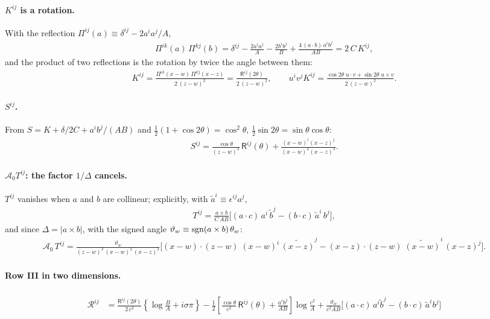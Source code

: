 \documentclass[10pt]{article}
\numberwithin{equation}{section}
\begin{document}
\paragraph{$K^{ij}$ is a rotation.} With the reflection $\Pi^{ij}(a)\equiv\delta^{ij}-2a^{i}a^{j}/A$,
\begin{align}
\Pi^{ik}(a)\,\Pi^{kj}(b)=\delta^{ij}-\frac{2a^{i}a^{j}}{A}-\frac{2b^{i}b^{j}}{B}+\frac{4\,(a\cdot b)\,a^{i}b^{j}}{AB}=2\,C\,K^{ij},
\end{align}
and the product of two reflections is the rotation by twice the angle between them:
\begin{align}
K^{ij}=\frac{\Pi^{ik}(x-w)\,\Pi^{kj}(x-z)}{2\,(z-w)^{2}}=\frac{\mathsf{R}^{ij}(2\theta)}{2\,(z-w)^{2}},\qquad
u^{i}v^{j}K^{ij}=\frac{\cos2\theta\;u\cdot v+\sin2\theta\;u\times v}{2\,(z-w)^{2}} .
\end{align}

\paragraph{$S^{ij}$.} From $S=K+\delta/2C+a^{i}b^{j}/(AB)$ and $\tfrac12(1+\cos2\theta)=\cos^{2}\theta$, $\tfrac12\sin2\theta=\sin\theta\cos\theta$:
\begin{align}
S^{ij}=\frac{\cos\theta}{(z-w)^{2}}\,\mathsf{R}^{ij}(\theta)+\frac{(x-w)^{i}(x-z)^{j}}{(x-w)^{2}(x-z)^{2}} .
\end{align}

\paragraph{$\mathcal{A}_{0}T^{ij}$: the factor $1/\Delta$ cancels.} $T^{ij}$ vanishes when $a$ and $b$ are collinear; explicitly, with $\tilde a^{i}\equiv\epsilon^{ij}a^{j}$,
\begin{align}
T^{ij}=\frac{a\times b}{C\,AB}\Big[(a\cdot c)\,a^{i}\,\tilde b^{j}-(b\cdot c)\,\tilde a^{i}\,b^{j}\Big],
\end{align}
and since $\Delta=|a\times b|$, with the signed angle $\vartheta_{w}\equiv{\rm sgn}(a\times b)\,\theta_{w}$:
\begin{align}
\mathcal{A}_{0}\,T^{ij}=\frac{\vartheta_{w}}{(z-w)^{2}\,(x-w)^{2}\,(x-z)^{2}}\Big[(x-w)\!\cdot\!(z-w)\;(x-w)^{i}\,\widetilde{(x-z)}^{j}-(x-z)\!\cdot\!(z-w)\;\widetilde{(x-w)}^{i}\,(x-z)^{j}\Big].
\end{align}

\paragraph{Row III in two dimensions.}
\begin{align}
\boxed{\;\begin{aligned}
\mathcal{R}^{ij}&=\frac{\mathsf{R}^{ij}(2\theta)}{2\,c^{2}}\left\{\log\frac{B}{A}+i\sigma\pi\right\}
-\frac12\left[\frac{\cos\theta}{c^{2}}\,\mathsf{R}^{ij}(\theta)+\frac{a^{i}b^{j}}{AB}\right]\log\frac{c^{2}}{A}
+\frac{\vartheta_{w}}{c^{2}AB}\Big[(a\cdot c)\,a^{i}\tilde b^{j}-(b\cdot c)\,\tilde a^{i}b^{j}\Big]
\end{aligned}\;} \label{eq:2D}
\end{align}
\end{document}
